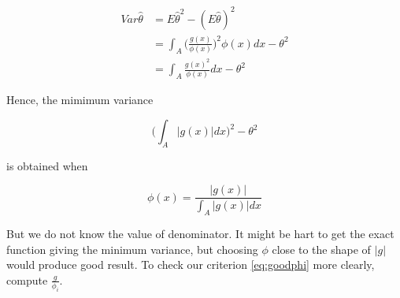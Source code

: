 \documentclass[]{book}
\newenvironment{Shaded}{\begin{snugshade}}{\end{snugshade}}
\newcommand{\DataTypeTok}[1]{\textcolor[rgb]{0.13,0.29,0.53}{#1}}
\newcommand{\DecValTok}[1]{\textcolor[rgb]{0.00,0.00,0.81}{#1}}
\newcommand{\FloatTok}[1]{\textcolor[rgb]{0.00,0.00,0.81}{#1}}
\newcommand{\KeywordTok}[1]{\textcolor[rgb]{0.13,0.29,0.53}{\textbf{#1}}}
\newcommand{\NormalTok}[1]{#1}
\newcommand{\OperatorTok}[1]{\textcolor[rgb]{0.81,0.36,0.00}{\textbf{#1}}}
\newcommand{\StringTok}[1]{\textcolor[rgb]{0.31,0.60,0.02}{#1}}
\theoremstyle{definition}
\theoremstyle{definition}
\theoremstyle{definition}
\theoremstyle{remark}
\begin{document}
\begin{equation*}
  \begin{split}
    Var\hat\theta & = E\hat\theta^2 - (E\hat\theta)^2 \\
    & = \int_A \bigg(\frac{g(x)}{\phi(x)}\bigg)^2 \phi(x) dx - \theta^2 \\
    & = \int_A \frac{g(x)^2}{\phi(x)} dx - \theta^2
  \end{split}
\end{equation*}

Hence, the mimimum variance

\[\bigg( \int_A \lvert g(x) \rvert dx \bigg)^2 - \theta^2\]

is obtained when

\[\phi(x) = \frac{\lvert g(x) \rvert}{\int_A \lvert g(x) \rvert dx}\]

But we do not know the value of denominator. It might be hart to get the exact function giving the minimum variance, but choosing \(\phi\) close to the shape of \(\lvert g \rvert\) would produce good result. To check our criterion \eqref{eq:goodphi} more clearly, compute \(\frac{g}{\phi_i}\).

\begin{Shaded}
\end{Shaded}
\end{document}
